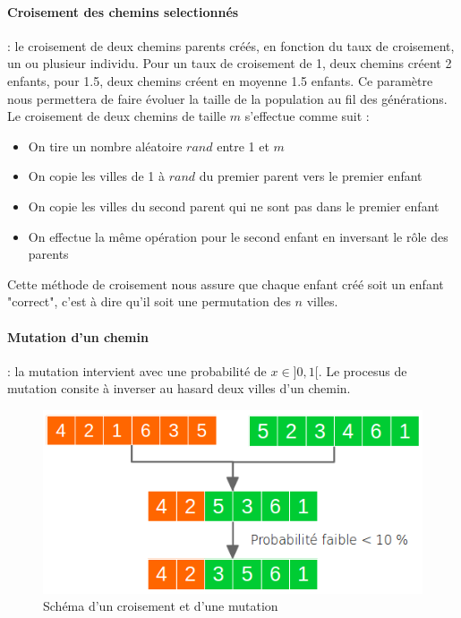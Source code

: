 \documentclass{article}
\begin{document}
    \paragraph{Croisement des chemins selectionnés}: le croisement de deux chemins parents créés, en fonction du taux de croisement, un ou plusieur individu. Pour un taux de croisement de 1, deux chemins créent 2 enfants, pour 1.5, deux chemins créent en moyenne 1.5 enfants. Ce paramètre nous permettera de faire évoluer la taille de la population au fil des générations.
    Le croisement de deux chemins de taille $m$ s'effectue comme suit :
    \begin{itemize}
    	\item On tire un nombre aléatoire $rand$ entre 1 et $m$
    	\item On copie les villes de 1 à $rand$ du premier parent vers le premier enfant
    	\item On copie les villes du second parent qui ne sont pas dans le premier enfant
    	\item On effectue la même opération pour le second enfant en inversant le rôle des parents
    \end{itemize}

    Cette méthode de croisement nous assure que chaque enfant créé soit un enfant "correct", c'est à dire qu'il soit une permutation des $n$ villes.

    \paragraph{Mutation d'un chemin}: la mutation intervient avec une probabilité de $x \in ]0, 1[$. Le procesus de mutation consite à inverser au hasard deux villes d'un chemin.

	\begin{figure}[!h]
		\begin{center}
			\includegraphics[scale=0.5]{croisement.png}
		\end{center}

		\caption{Schéma d'un croisement et d'une mutation}

		\label{Schéma d'un croisement et d'une mutation}
	\end{figure}
\end{document}
